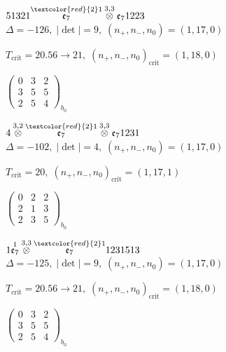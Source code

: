 \documentclass[10pt]{article}
\begin{document}
\smallskip

$51321\overset{\textcolor{red}{2}1}{\mathfrak{e}_7}\overset{3,3}{\otimes}\mathfrak{e}_71223$ \quad $\Delta=-126,\; |\det|=9,\; (n_+,n_-,n_0)=(1,17,0)$

\hspace{1em}$T_{\text{crit}}=20.56 \to 21,\; (n_+,n_-,n_0)_{\text{crit}}=(1,18,0)$

\hspace{2em}$\left(\begin{smallmatrix}0 & 3 & 2 \\ 3 & 5 & 5 \\ 2 & 5 & 4\end{smallmatrix}\right)_{\!b_0}$

\smallskip

$4\overset{3,2}{\otimes}\overset{\textcolor{red}{2}1}{\mathfrak{e}_7}\overset{3,3}{\otimes}\mathfrak{e}_71231$ \quad $\Delta=-102,\; |\det|=4,\; (n_+,n_-,n_0)=(1,17,0)$

\hspace{1em}$T_{\text{crit}}=20,\; (n_+,n_-,n_0)_{\text{crit}}=(1,17,1)$

\hspace{2em}$\left(\begin{smallmatrix}0 & 2 & 2 \\ 2 & 1 & 3 \\ 2 & 3 & 5\end{smallmatrix}\right)_{\!b_0}$

\smallskip

$1\overset{1}{\mathfrak{e}_7}\overset{3,3}{\otimes}\overset{\textcolor{red}{2}1}{\mathfrak{e}_7}1231513$ \quad $\Delta=-125,\; |\det|=9,\; (n_+,n_-,n_0)=(1,17,0)$

\hspace{1em}$T_{\text{crit}}=20.56 \to 21,\; (n_+,n_-,n_0)_{\text{crit}}=(1,18,0)$

\hspace{2em}$\left(\begin{smallmatrix}0 & 3 & 2 \\ 3 & 5 & 5 \\ 2 & 5 & 4\end{smallmatrix}\right)_{\!b_0}$
\end{document}
